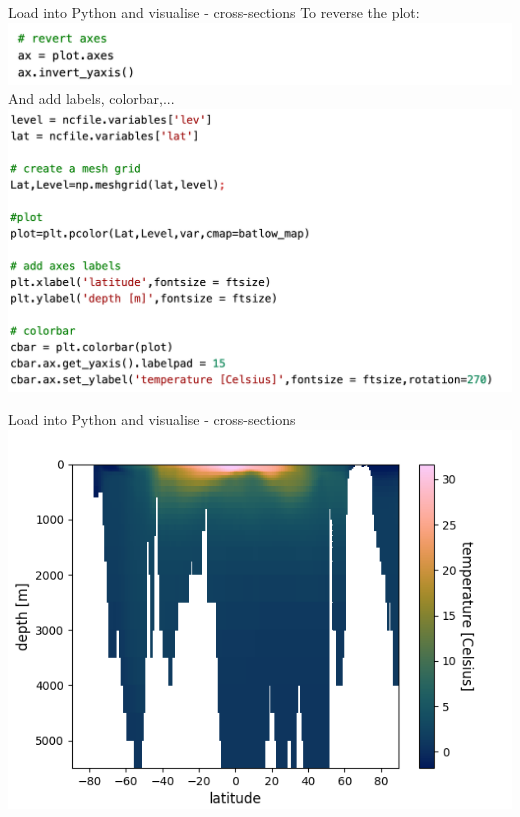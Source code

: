   
\begin{frame}{\insertsectionnumber{ |} Load into Python and visualise - cross-sections}
    To reverse the plot:\\
    \includegraphics[scale=0.35]{images/Script2_step2.png}\\
    And add labels, colorbar,...
    \includegraphics[scale=0.35]{images/Script2_step3.png}
\end{frame}
 
 
\begin{frame}{\insertsectionnumber{ |} Load into Python and visualise - cross-sections} 
    \includegraphics[scale=0.45]{images/script1_fig8.png}
\end{frame}


